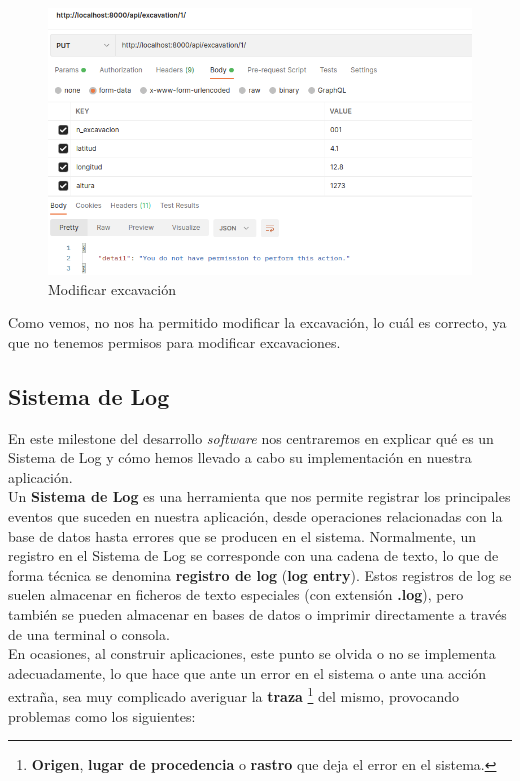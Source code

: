         \begin{figure}[H]
            \centering
            \includegraphics[scale=0.40]{imagenes/put-excavation.png}
            \caption{Modificar excavación}
            \label{fig:put-excavation}
        \end{figure}

Como vemos, no nos ha permitido modificar la excavación, lo cuál es correcto, ya que no
tenemos permisos para modificar excavaciones.

\subsection{Sistema de Log}
En este milestone del desarrollo \textit{software} nos centraremos en explicar qué es un
Sistema de Log y cómo hemos llevado a cabo su implementación en nuestra aplicación. \\

Un \textbf{Sistema de Log} \cite{log-system} es una herramienta que nos permite registrar los principales
eventos que suceden en nuestra aplicación, desde operaciones relacionadas con la base de
datos hasta errores que se producen en el sistema. Normalmente, un registro en el Sistema
de Log se corresponde con una cadena de texto, lo que de forma técnica se denomina
\textbf{registro de log} (\textbf{log entry}). Estos registros de log se suelen
almacenar en ficheros de texto especiales (con extensión \textbf{.log}), pero también
se pueden almacenar en bases de datos o imprimir directamente a través de una terminal
o consola.\\

En ocasiones, al construir aplicaciones, este punto se olvida o no se implementa
adecuadamente, lo que hace que ante un error en el sistema o ante una acción extraña, sea
muy complicado averiguar la \textbf{traza} \footnote{\textbf{Origen},
\textbf{lugar de procedencia} o \textbf{rastro} que deja el error en el sistema.} del
mismo, provocando problemas como los siguientes:

